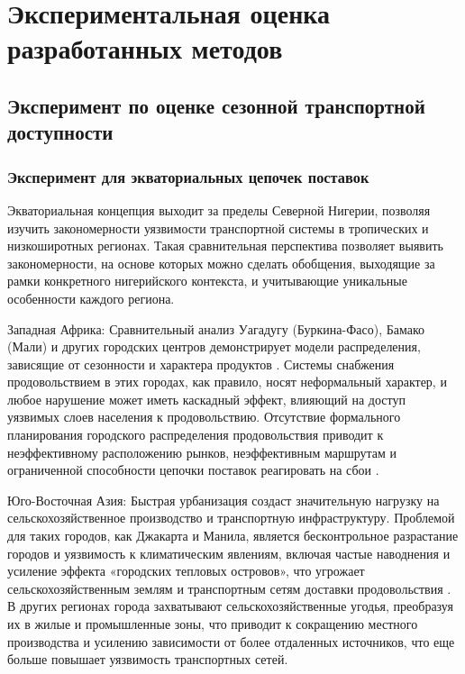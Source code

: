 \chapter{Экспериментальная оценка разработанных методов}
\label{ch:arctic-experiments}

\section{Эксперимент по оценке сезонной транспортной доступности}
\label{sec:seasonal-accessibility-experiment}

\subsection{Эксперимент для экваториальных цепочек поставок}
\label{subsec:equatorial-results}


Экваториальная концепция выходит за пределы Северной Нигерии, позволяя изучить закономерности уязвимости транспортной системы в тропических и низкоширотных регионах. Такая сравнительная перспектива позволяет выявить закономерности, на основе которых можно сделать обобщения, выходящие за рамки конкретного нигерийского контекста, и учитывающие уникальные особенности каждого региона.

Западная Африка: Сравнительный анализ Уагадугу (Буркина-Фасо), Бамако (Мали) и других городских центров демонстрирует модели распределения, зависящие от сезонности и характера продуктов \cite{karg2016foodsheds}. Системы снабжения продовольствием в этих городах, как правило, носят неформальный характер, и любое нарушение может иметь каскадный эффект, влияющий на доступ уязвимых слоев населения к продовольствию. Отсутствие формального планирования городского распределения продовольствия приводит к неэффективному расположению рынков, неэффективным маршрутам и ограниченной способности цепочки поставок реагировать на сбои \cite{ofori2022food}.

Юго-Восточная Азия: Быстрая урбанизация создаст значительную нагрузку на сельскохозяйственное производство и транспортную инфраструктуру. Проблемой для таких городов, как Джакарта и Манила, является бесконтрольное разрастание городов и уязвимость к климатическим явлениям, включая частые наводнения и усиление эффекта «городских тепловых островов», что угрожает сельскохозяйственным землям и транспортным сетям доставки продовольствия \cite{arifai2025urban}. В других регионах города захватывают сельскохозяйственные угодья, преобразуя их в жилые и промышленные зоны, что приводит к сокращению местного производства и усилению зависимости от более отдаленных источников, что еще больше повышает уязвимость транспортных сетей.

